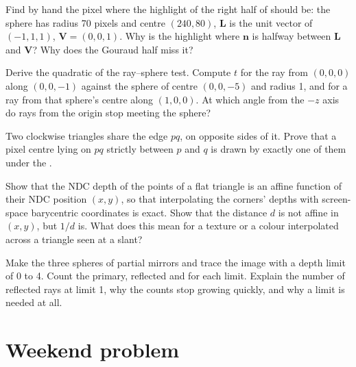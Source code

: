\begin{exercise}[$\star\star$]\label{exo:b3:computer-graphics:8}
Find by hand the pixel where the highlight of the right half of  should be: the sphere has radius 70 pixels and centre $(240, 80)$, $\mathbf L$ is the unit vector of $(-1, 1, 1)$, $\mathbf V = (0, 0, 1)$. Why is the highlight where $\mathbf n$ is halfway between $\mathbf L$ and $\mathbf V$? Why does the Gouraud half miss it?
\end{exercise}

\begin{exercise}[$\star\star$]\label{exo:b3:computer-graphics:9}
Derive the quadratic of the ray--sphere test. Compute $t$ for the ray from $(0, 0, 0)$ along $(0, 0, -1)$ against the sphere of centre $(0, 0, -5)$ and radius 1, and for a ray from that sphere's centre along $(1, 0, 0)$. At which angle from the $-z$ axis do rays from the origin stop meeting the sphere?
\end{exercise}

\begin{exercise}[$\star\star\star$]\label{exo:b3:computer-graphics:10}
Two clockwise triangles share the edge $pq$, on opposite sides of it. Prove that a pixel centre lying on $pq$ strictly between $p$ and $q$ is drawn by exactly one of them under the .
\end{exercise}

\begin{exercise}[$\star\star\star$]\label{exo:b3:computer-graphics:11}
Show that the NDC depth of the points of a flat triangle is an affine function of their NDC position $(x, y)$, so that interpolating the corners' depths with screen-space barycentric coordinates is exact. Show that the distance $d$ is not affine in $(x, y)$, but $1/d$ is. What does this mean for a texture or a colour interpolated across a triangle seen at a slant?
\end{exercise}

\begin{exercise}[$\star\star\star$]\label{exo:b3:computer-graphics:12}
Make the three spheres of  partial mirrors and trace the image with a depth limit of 0 to 4. Count the primary, reflected and  for each limit. Explain the number of reflected rays at limit 1, why the counts stop growing quickly, and why a limit is needed at all.
\end{exercise}

\section{Weekend problem}\label{sec:b3:computer-graphics:problem}

